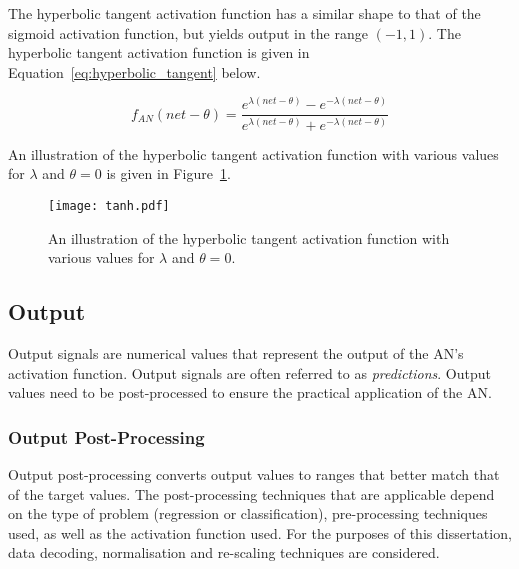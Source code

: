 The hyperbolic tangent activation function has a similar shape to that of the sigmoid activation function, but yields output in the range $(-1, 1)$. The hyperbolic tangent activation function is given in Equation~\eqref{eq:hyperbolic_tangent} below.

\begin{equation}
    f_{AN}(net - \theta) = \frac{e^{\lambda(net - \theta)}-e^{-\lambda(net - \theta)}}{e^{\lambda(net - \theta)}+e^{-\lambda(net - \theta)}}
    \label{eq:hyperbolic_tangent}
\end{equation}

\noindent
An illustration of the hyperbolic tangent activation function with various values for $\lambda$ and $\theta = 0$ is given in Figure~\ref{fig:anns:activation_functions:hyperbolic_tangent}.


\begin{figure}[htpb]
    \centering
    \texttt{[image: tanh.pdf]}
    \caption[The hyperbolic tangent activation function]{An illustration of the hyperbolic tangent activation function with various values for $\lambda$ and $\theta = 0$.}
    \label{fig:anns:activation_functions:hyperbolic_tangent}
\end{figure}


\subsection{Output}\label{sec:anns:an:output}

Output signals are numerical values that represent the output of the \acs{AN}'s activation function. Output signals are often referred to as \textit{predictions}. Output values need to be post-processed to ensure the practical application of the \acs{AN}.

\subsubsection{Output Post-Processing}\label{sec:anns:an:output:output_post_processing}

Output post-processing converts output values to ranges that better match that of the target values. The post-processing techniques that are applicable depend on the type of problem (regression or classification), pre-processing techniques used, as well as the activation function used. For the purposes of this dissertation, data decoding, normalisation and
re-scaling techniques are considered.


